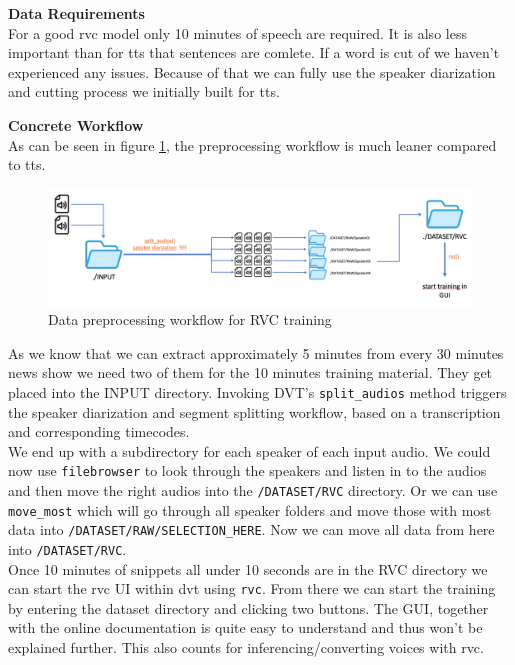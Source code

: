 \documentclass[
  a4paper,  %
  twoside,  %
  bibliography=totoc,
  headsepline,
  cleardoublepage=empty,
  parskip=half,
  draft=false
]{scrbook}
\begin{document}
\textbf{Data Requirements} \\
For a good \gls{rvc} model only 10 minutes of speech are required. It is also less important than for \gls{tts} that sentences are comlete. If a word is cut of we haven't experienced any issues. Because of that we can fully use the speaker diarization and cutting process we initially built for \gls{tts}. 

\textbf{Concrete Workflow} \\
As can be seen in figure \ref{fig:rvc-wf}, the preprocessing workflow is much leaner compared to \gls{tts}.
\begin{figure}[h]
  \centering
  \includegraphics[width=1\textwidth]{./graphics/images/rvc/rvc-workflow.png}
  \caption{Data preprocessing workflow for RVC training}
  \label{fig:rvc-wf}
\end{figure}
As we know that we can extract approximately 5 minutes from every 30 minutes news show we need two of them for the 10 minutes training material. They get placed into the INPUT directory. Invoking DVT's \verb|split_audios| method triggers the speaker diarization and segment splitting workflow, based on a transcription and corresponding timecodes. \\
We end up with a subdirectory for each speaker of each input audio. We could now use \verb|filebrowser| to look through the speakers and listen in to the audios and then move the right audios into the \verb|/DATASET/RVC| directory. Or we can use \verb|move_most| which will go through all speaker folders and move those with most data into \verb|/DATASET/RAW/SELECTION_HERE|. Now we can move all data from here into \verb|/DATASET/RVC|. \\
Once 10 minutes of snippets all under 10 seconds are in the RVC directory we can start the \gls{rvc} UI within \gls{dvt} using \verb|rvc|. From there we can start the training by entering the dataset directory and clicking two buttons. The GUI, together with the online documentation is quite easy to understand and thus won't be explained further. This also counts for inferencing/converting voices with \gls{rvc}.
\end{document}
